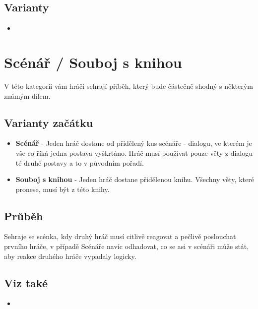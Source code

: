 \documentclass[main.tex]{subfiles}
\begin{document}
 
\subsection{ Varianty } \begin{itemize}
\item  {}
\end{itemize}
 
 
 
\needspace{5cm} \section{Scénář / Souboj s knihou} \label{scénář / souboj s knihou}  
 
 
V této  kategorii  vám hráči sehrají příběh, který bude částečně shodný s  některým známým dílem. 
 
\subsection{Varianty začátku} \begin{itemize}
\item \textbf{Scénář}{} - Jeden hráč dostane od  přidělený kus scénáře - dialogu, ve kterém je vše co říká jedna postava vyškrtáno. Hráč musí používat pouze věty z dialogu té druhé postavy a to v původním pořadí.
\item \textbf{Souboj s knihou}{} - Jeden hráč dostane přidělenou knihu.  Všechny věty, které pronese, musí být  z této knihy.
\end{itemize}
 
\subsection{Průběh} Sehraje se scénka, kdy druhý hráč musí citlivě reagovat a pečlivě poslouchat prvního hráče, v případě Scénáře navíc odhadovat, co se asi v scénáři může stát, aby reakce druhého hráče vypadaly logicky. 
 
\subsection{Viz také} \begin{itemize}
\item  {}
\end{itemize}
 
 
 
\end{document}

